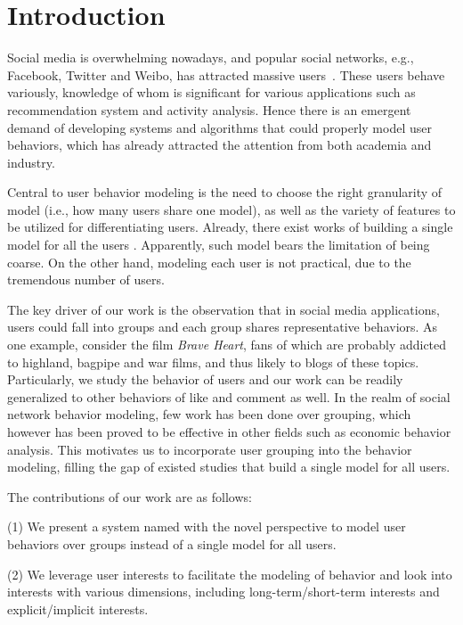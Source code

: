\section{Introduction}
\label{sec:intro}

\par Social media is overwhelming nowadays, and popular social networks, e.g., Facebook, Twitter and Weibo, has attracted  massive users~\cite{DBLP:journals/fcsc/MaLHLH16,DBLP:journals/tkde/DuanMAMH17,DBLP:conf/icde/HuAMH16}.
These users behave variously, knowledge of whom is significant for various applications such as recommendation system and activity analysis.
Hence there is an emergent demand of developing systems and algorithms that could properly model user behaviors, which has already attracted the attention from both academia and industry.

Central to user behavior modeling is the need to choose the right granularity of model (i.e., how many users share one model), as well as the variety of features to be utilized for differentiating users.
Already, there exist works of building a single model for all the users \cite{IEEEexample:conf/wsdm/FengW13,IEEEexample:conf/ijcai/ZhangLTCL13}.
Apparently, such model bears the limitation of being coarse.
On the other hand, modeling each user is not practical, due to the tremendous number of users.

The key driver of our work is the observation that in social media applications, users could fall into groups and each group shares representative behaviors.
%
As one example, consider the film \textit{Brave Heart}, fans of which are probably addicted to highland, bagpipe and war films, and thus likely to \ret{} blogs of these topics.
Particularly, we study the \retg{} behavior of users and our work can be readily generalized to other behaviors of like and comment as well.
In the realm of social network behavior modeling, few work has been done over grouping, which however has been proved to be effective in other fields such as economic behavior analysis.
This motivates us to incorporate user grouping into the \retg{} behavior modeling, filling the gap of existed studies that build a single model for all users.

The contributions of our work are as follows:

\stab(1) We present a system named \sys{} with the novel perspective to model user behaviors over groups instead of a single model for all users.

\stab(2) We leverage user interests to facilitate the modeling of \retg{} behavior and look into interests with various dimensions, including long-term/short-term interests and explicit/implicit interests.

